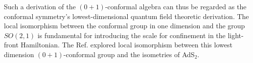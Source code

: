 \documentclass[%
 reprint,
superscriptaddress,
 amsmath,amssymb,
 aps,
]{revtex4-2}
\begin{document}
\begin{table}[h!]
\centering
\caption{\label{tabelinterpolationifd01}$0+1$ conformal algebra in IFD}
\end{table}

Such a derivation of the $(0+1)$-conformal algebra can thus be regarded as the conformal symmetry's lowest-dimensional quantum field theoretic derivation. The local isomorphism between the conformal group in one dimension and the group
$SO(2, 1)$ is fundamental for introducing the scale for confinement in the light-front
Hamiltonian. The Ref.\cite{Brodsky_2015} explored local isomorphism between this lowest dimension $(0+1)$-conformal group and the isometries of AdS$_2$.

\begin{table}[h!]
\centering
\caption{\label{tabelinterpolationifd10}$1+0$ conformal algebra in IFD}
\end{table}
\end{document}

